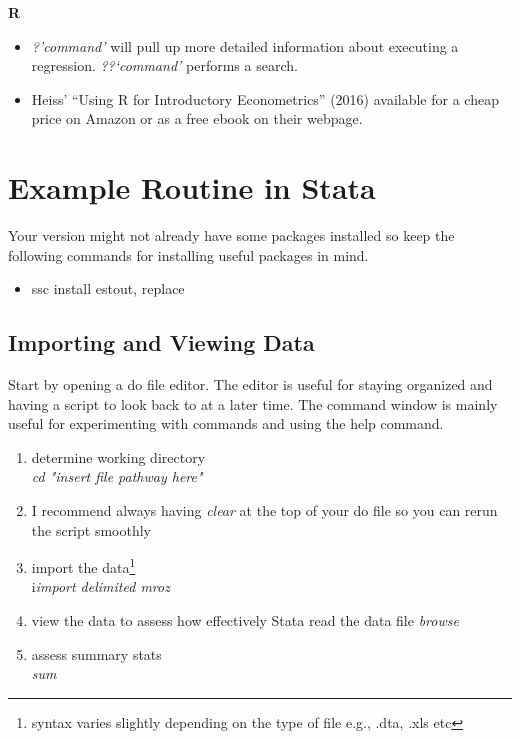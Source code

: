 \documentclass[12pt]{article}%
\begin{document}
\textbf{R}
\begin{itemize}
\item \textit{?'command'} will pull up more detailed information about executing a regression. \textit{??`command'} performs a search. 
\item Heiss’ “Using R for Introductory Econometrics” (2016) available for a cheap price on
Amazon or as a free ebook on their webpage.
\end{itemize}


\pagebreak
\section{Example Routine in Stata}
Your version might not already have some packages installed so keep the following commands for installing useful packages in mind.
\begin{itemize}
\item ssc install estout, replace
\end{itemize}

\subsection {Importing and Viewing Data}
Start by opening a do file editor. The editor is useful for staying organized and having a script to look back to at a later time. The command window is mainly useful for experimenting with commands and using the help command. 
\begin{enumerate}
\item determine working directory \\
\textit{cd "insert file pathway here"}
\item I recommend always having \textit{clear} at the top of your do file so you can rerun the script smoothly
\item import the data\footnote{syntax varies slightly depending on the type of file e.g., .dta, .xls etc} \\ i\textit{import delimited mroz }
\item view the data to assess how effectively Stata read the data file \textit{browse}
\item assess summary stats \\ \textit{sum} 
\end{enumerate}
\end{document}
